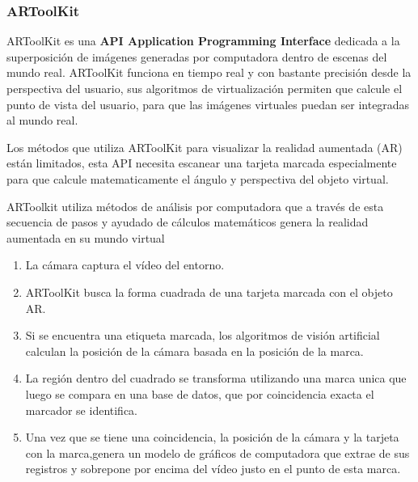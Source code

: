 \subsubsection{ARToolKit}
ARToolKit es una \textbf{API Application Programming Interface} dedicada a la superposición de imágenes generadas por computadora dentro de escenas del mundo real. ARToolKit funciona en tiempo real y con bastante precisión desde la perspectiva del usuario, sus algoritmos de virtualización permiten que calcule el punto de vista del usuario, para que las imágenes virtuales puedan ser integradas al mundo real.\cite{B07}\par
Los métodos que utiliza ARToolKit para visualizar la realidad aumentada (AR) están limitados, esta API necesita escanear una tarjeta marcada especialmente para que calcule matematicamente el ángulo y perspectiva del objeto virtual.\cite{B07}\par

ARToolkit utiliza métodos de análisis por computadora que a través de esta secuencia de pasos y ayudado de cálculos matemáticos genera la realidad aumentada en su mundo virtual \par
\begin{enumerate}[1.]
	\item  La cámara captura el vídeo del entorno.
	\item ARToolKit busca la forma cuadrada de una tarjeta marcada con el objeto AR.
	\item Si se encuentra una etiqueta marcada, los algoritmos de visión artificial calculan la posición de la cámara basada en la posición de la marca.
	\item La región dentro del cuadrado se transforma utilizando una marca unica que luego se compara en una
	base de datos, que por coincidencia exacta el marcador se identifica.
	\item Una vez que se tiene una coincidencia, la posición de la cámara y la tarjeta con la marca,genera un modelo de gráficos de computadora que extrae de sus registros y sobrepone por encima del vídeo justo en el punto de esta marca.
\end{enumerate}


